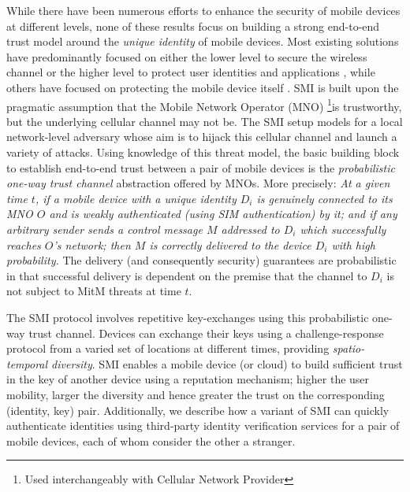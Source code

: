 \documentclass[letterpaper,twocolumn]{sig-alternate}
\begin{document}
While there have been numerous efforts to enhance the security of mobile devices at different levels, none of these results focus on building a strong end-to-end trust model around the {\em unique identity} of mobile devices. Most existing solutions have predominantly focused on either the lower level to secure the wireless channel \cite{securepairing, bambos2000channel} or the higher level to protect user identities and applications \cite{lookout, otp, 2fauth}, while others have focused on protecting the mobile device itself \cite{cook2010method}. SMI is built upon the pragmatic assumption that the Mobile Network Operator (MNO) \footnote{Used interchangeably with Cellular Network Provider}is trustworthy, but the underlying cellular channel may not be. The SMI setup models for a local network-level adversary whose aim is to hijack this cellular channel and launch a variety of attacks. Using knowledge of this threat model, the basic building block to establish end-to-end trust between a pair of mobile devices is the {\em probabilistic one-way trust channel} abstraction offered by MNOs. More precisely: {\em At a given time $t$, if a mobile device with a unique identity $D_i$ is genuinely connected to its MNO $O$ and is weakly authenticated (using SIM authentication) by it; and if any arbitrary sender sends a control message $M$ addressed to $D_i$ which successfully reaches $O$'s network; then $M$ is correctly delivered to the device $D_i$ with high probability.} The delivery (and consequently security) guarantees are probabilistic in that successful delivery is dependent on the premise that the channel to $D_i$ is not subject to MitM threats at time $t$.

The SMI protocol involves repetitive key-exchanges using this probabilistic one-way trust channel. Devices can exchange their keys using a challenge-response protocol from a varied set of locations at different times, providing {\em spatio-temporal diversity}. SMI enables a mobile device (or cloud) to build sufficient trust in the key of another device using a reputation mechanism; higher the user mobility, larger the diversity and hence greater the trust on the corresponding (identity, key) pair. Additionally, we describe how a variant of SMI can quickly authenticate identities using third-party identity verification services for a pair of mobile devices, each of whom consider the other a stranger. 
\end{document}
